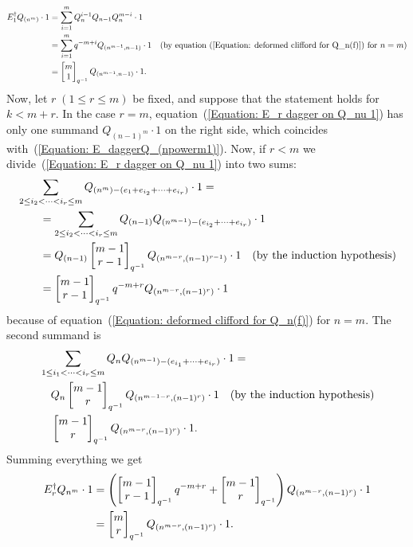 \begin{equation}
\begin{split}
    E_1^\dagger Q_{(n^m)}\cdot1&=\sum_{i=1}^mQ_{n}^{i-1}Q_{n-1}Q_{n}^{m-i}\cdot1\\
    &=\sum_{i=1}^mq^{-m+i}Q_{(n^{m-1},n-1)}\cdot1\quad(\text{by equation~(\ref{Equation: deformed clifford for Q_n(f)}) for }n=m)\\
    &=\begin{bmatrix} m\\1\end{bmatrix}_{q^{-1}}Q_{(n^{m-1},n-1)}\cdot1.
\end{split}
\end{equation}
Now, let $r\; (1\leq r\leq m)$ be fixed, and suppose that the statement holds for $k<m+r$. In the case $r=m$, equation~(\ref{Equation: E_r dagger on Q_nu 1}) has only one summand $Q_{(n-1)^m}\cdot1$ on the right side, which coincides with~(\ref{Equation: E_daggerQ_(npowerm1)}). Now, if $r<m$ we divide~(\ref{Equation: E_r dagger on Q_nu 1}) into two sums:
\begin{equation}
\begin{split}
      &\sum_{2\leq i_2<\cdots<i_r\leq m}Q_{(n^m)-(e_1+e_{i_2}+\dots+e_{i_r})}\cdot1= \\
      &\quad\quad= \sum_{2\leq i_2<\cdots<i_r\leq m}Q_{(n-1)}Q_{(n^{m-1})-(e_{i_2}+\cdots+e_{i_r})}\cdot1\\
      &\quad\quad=Q_{(n-1)}\begin{bmatrix} m-1\\r-1\end{bmatrix}_{q^{-1}}Q_{(n^{m-r},(n-1)^{r-1})}\cdot1\quad(\text{by the induction hypothesis})\\
      &\quad\quad =\begin{bmatrix} m-1\\r-1\end{bmatrix}_{q^{-1}}q^{-m+r}Q_{(n^{m-r},(n-1)^r)}\cdot 1
\end{split}
\end{equation}
because of equation~(\ref{Equation: deformed clifford for Q_n(f)}) for $n=m$. The second summand is
\begin{equation}
    \begin{split}
        &\sum_{1\leq i_1<\cdots<i_r\leq m}Q_{n}Q_{(n^{m-1})-(e_{i_1}+\cdots+e_{i_r})}\cdot1=\\
        &\quad Q_n\begin{bmatrix} m-1\\r\end{bmatrix}_{q^{-1}}Q_{(n^{m-1-r},(n-1)^r)}\cdot1\quad(\text{by the induction hypothesis})\\
        &\quad\begin{bmatrix} m-1\\r\end{bmatrix}_{q^{-1}}Q_{(n^{m-r},(n-1)^r)}\cdot1.
    \end{split}
\end{equation}
Summing everything we get
\begin{equation}
\begin{split}
     E_r^\dagger Q_{n^{m}}\cdot1 &= \left(\begin{bmatrix} m-1\\r-1\end{bmatrix}_{q^{-1}}q^{-m+r}+\begin{bmatrix} m-1\\r\end{bmatrix}_{q^{-1}}\right)Q_{(n^{m-r},(n-1)^r)}\cdot1\\
     &=\begin{bmatrix} m\\r\end{bmatrix}_{q^{-1}}Q_{(n^{m-r},(n-1)^r)}\cdot1.
\end{split} 
\end{equation}

